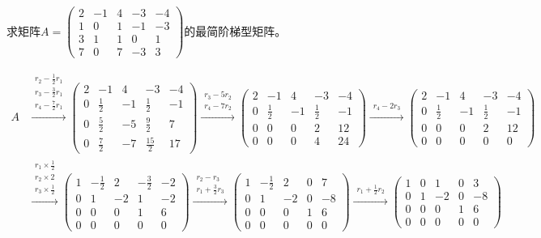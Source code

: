 \documentclass[a4paper]{report}
\begin{document}
\EX 求矩阵$A=
\begin{pmatrix}
2 &-1&4&-3&-4\\ 1&0&1&-1&-3\\ 3&1&1&0&1\\ 7&0&7&-3&3
\end{pmatrix}
$的最简阶梯型矩阵。

\begin{jie}
\begin{align*}
A&\xrightarrow{\substack{r_2-\frac{1}{2}r_1\\ r_3-\frac{3}{2}r_1\\ r_4-\frac{7}{2}r_1}}
{
\begin{pmatrix}
2 &-1&4&-3&-4\\ 0&\frac{1}{2}&-1&\frac{1}{2}&-1\\ 0&\frac{5}{2}&-5&\frac{9}{2}&7\\ 0&\frac{7}{2}&-7&\frac{15}{2}&17
\end{pmatrix}
}\xrightarrow{\substack{r_3-5r_2\\ r_4-7r_2}}
{
\begin{pmatrix}
2 &-1&4&-3&-4\\ 0&\frac{1}{2}&-1&\frac{1}{2}&-1\\ 0&0&0&2&12\\ 0&0&0&4&24
\end{pmatrix}
}\xrightarrow{\substack{r_4-2r_3}}
{
\begin{pmatrix}
2 &-1&4&-3&-4\\ 0&\frac{1}{2}&-1&\frac{1}{2}&-1\\ 0&0&0&2&12\\ 0&0&0&0&0
\end{pmatrix}
}\\ &\xrightarrow{\substack{r_1\times \frac{1}{2}\\ r_2\times 2\\ r_{3}\times\frac{1}{2}}}
{
\begin{pmatrix}
1 &-\frac{1}{2}&2&-\frac{3}{2}&-2\\ 0&1&-2&1&-2\\ 0&0&0&1&6\\ 0&0&0&0&0
\end{pmatrix}
}\xrightarrow{\substack{r_2-r_{3}\\ r_1+\frac{3}{2}r_{3}}}
{
\begin{pmatrix}
1 &-\frac{1}{2}&2&0&7\\ 0&1&-2&0&-8\\ 0&0&0&1&6\\ 0&0&0&0&0
\end{pmatrix}
}\xrightarrow{\substack{r_1+\frac{1}{2}r_{2}}}
{
\begin{pmatrix}
1 &0&1&0&3\\ 0&1&-2&0&-8\\ 0&0&0&1&6\\ 0&0&0&0&0
\end{pmatrix}
}
\end{align*}
\end{jie}
\end{document}
